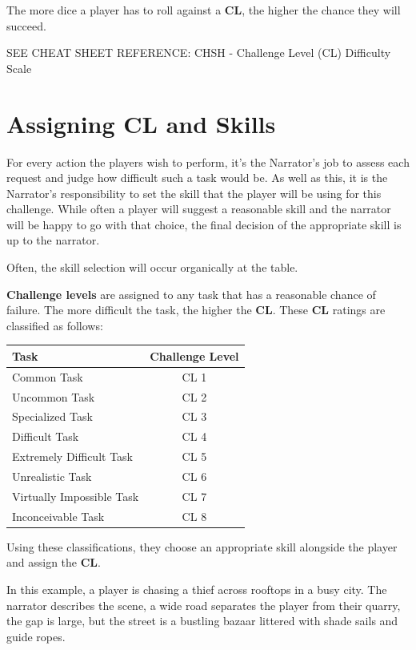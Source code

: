 The more dice a player has to roll against a \textbf{CL}, the higher the chance they will succeed.

SEE CHEAT SHEET REFERENCE: CHSH - Challenge Level (CL) Difficulty Scale

\section{Assigning CL and Skills} \label{sec:assigning_cl_and_skills}

For every action the players wish to perform, it’s the Narrator’s job to assess each request and judge how difficult such a task would be. As well as this, it is the Narrator’s responsibility to set the skill that the player will be using for this challenge. While often a player will suggest a reasonable skill and the narrator will be happy to go with that choice, the final decision of the appropriate skill is up to the narrator.  

Often, the skill selection will occur organically at the table.

\textbf{Challenge levels} are assigned to any task that has a reasonable chance of failure. The more difficult the task, the higher the \textbf{CL}. These \textbf{CL} ratings are classified as follows:

\begin{center}
    \begin{xltabular}{0.5\textwidth}{|l|c|} 
        \hline 
        \textbf{Task} & \textbf{Challenge Level} \\ 
        \hline
        Common Task & CL 1 \\
        Uncommon Task & CL 2 \\
        Specialized Task & CL 3 \\
        Difficult Task & CL 4 \\
        Extremely Difficult Task & CL 5 \\
        Unrealistic Task & CL 6 \\
        Virtually Impossible Task & CL 7 \\
        Inconceivable Task & CL 8 \\
        \hline
    \end{xltabular}
\end{center}

Using these classifications, they choose an appropriate skill alongside the player and assign the \textbf{CL}.

In this example, a player is chasing a thief across rooftops in a busy city. The narrator describes the scene, a wide road separates the player from their quarry, the gap is large, but the street is a bustling bazaar littered with shade sails and guide ropes.

